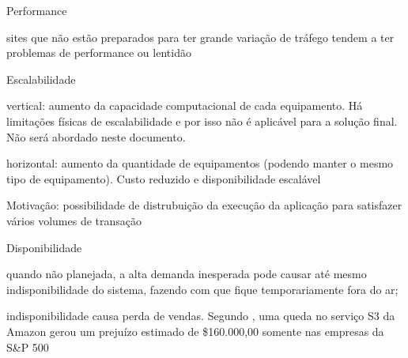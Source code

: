 \begin{alineas}

  \item Performance

  \begin{alineas}
     \item sites que não estão preparados para ter grande variação de tráfego
           tendem a ter problemas de performance ou lentidão
  \end{alineas}

  \item Escalabilidade

  \begin{alineas}
     \item vertical: aumento da capacidade computacional de cada equipamento.
           Há limitações físicas de escalabilidade e por isso não é aplicável
           para a solução final.
           Não será abordado neste documento.
     \item horizontal: aumento da quantidade de equipamentos
           (podendo manter o mesmo tipo de equipamento). Custo reduzido e
           disponibilidade escalável
     \item Motivação: possibilidade de distrubuição da execução da aplicação para satisfazer
           vários volumes de transação \cite{arquiteturas-em-n-camadas}
  \end{alineas}

  \item Disponibilidade

  \begin{alineas}
     \item quando não planejada, a alta demanda inesperada pode causar até mesmo
           indisponibilidade do sistema, fazendo com que fique temporariamente
           fora do ar;
     \item indisponibilidade causa perda de vendas. Segundo
           \cite{disponibilidade-downtime-perdas}, uma queda no serviço S3 da
           Amazon gerou um prejuízo estimado de \$160.000,00 somente nas empresas
           da S\&P 500
  \end{alineas}

\end{alineas}
